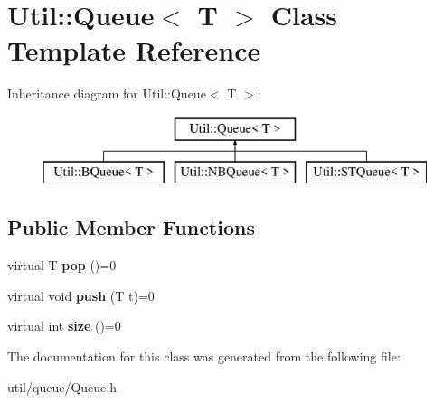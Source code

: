 \hypertarget{class_util_1_1_queue}{}\section{Util\+:\+:Queue$<$ T $>$ Class Template Reference}
\label{class_util_1_1_queue}
Inheritance diagram for Util\+:\+:Queue$<$ T $>$\+:\begin{figure}[H]
\begin{center}
\leavevmode
\includegraphics[height=2.000000cm]{class_util_1_1_queue}
\end{center}
\end{figure}
\subsection*{Public Member Functions}
\begin{DoxyCompactItemize}
\item 
\mbox{\label{class_util_1_1_queue_ac4496936a971174064269f542ff44c5a}} 
virtual T {\bfseries pop} ()=0
\item 
\mbox{\label{class_util_1_1_queue_ab201f265252a832dd3629ba53af5a8b9}} 
virtual void {\bfseries push} (T t)=0
\item 
\mbox{\label{class_util_1_1_queue_a7ecc9dbe7c52f9f49a575d43ff8cc583}} 
virtual int {\bfseries size} ()=0
\end{DoxyCompactItemize}


The documentation for this class was generated from the following file\+:\begin{DoxyCompactItemize}
\item 
util/queue/Queue.\+h\end{DoxyCompactItemize}
